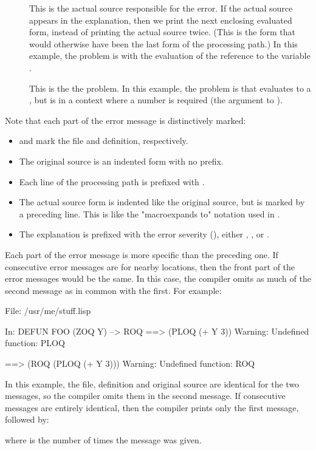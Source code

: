 \begin{description}
\item[]
This is the \i{actual source} responsible for the error.  If the actual
source appears in the explanation, then we print the next enclosing evaluated
form, instead of printing the actual source twice.  (This is the form that
would otherwise have been the last form of the processing path.)  In this
example, the problem is with the evaluation of the reference to the variable
.

\item[]
This is the  the problem.  In this example, the
problem is that  evaluates to a , but is in a context where a
number is required (the argument to \code{+}).
\end{description}

Note that each part of the error message is distinctively marked:
\begin{itemize}

\item
{} and  mark the file and definition, respectively.

\item
The original source is an indented form with no prefix.

\item
Each line of the processing path is prefixed with \code{-->}.

\item
The actual source form is indented like the original source, but is marked by a
preceding \code{==>} line.  This is like the "macroexpands to" notation used in
\cltl.

\item
The explanation is prefixed with the error severity (), either , , or .
\end{itemize}


Each part of the error message is more specific than the preceding one.  If
consecutive error messages are for nearby locations, then the front part of the
error messages would be the same.  In this case, the compiler omits as much of
the second message as in common with the first.  For example:
\begin{example}
File: /usr/me/stuff.lisp

In: DEFUN FOO
  (ZOQ Y)
--> ROQ 
==>
  (PLOQ (+ Y 3))
Warning: Undefined function: PLOQ

==>
  (ROQ (PLOQ (+ Y 3)))
Warning: Undefined function: ROQ
\end{example}
In this example, the file, definition and original source are identical for the
two messages, so the compiler omits them in the second message.  If consecutive
messages are entirely identical, then the compiler prints only the first
message, followed by:
\begin{example}
\end{example}
where  is the number of times the message was given.

